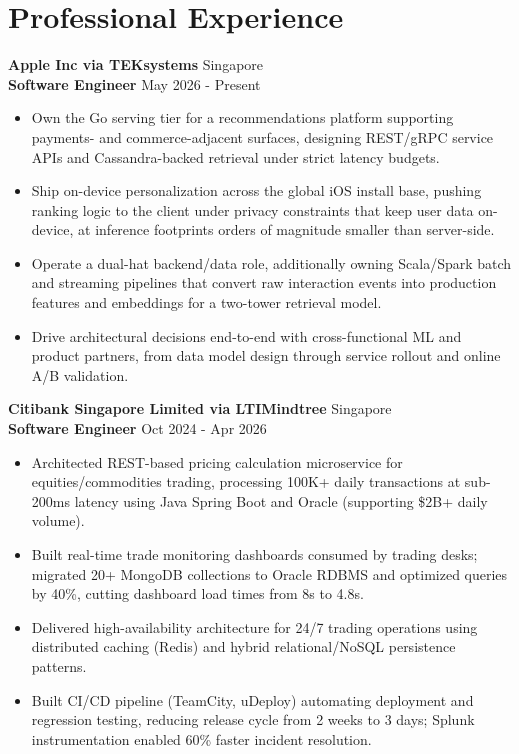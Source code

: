 \documentclass[10pt,a4paper]{article}
\newcommand{\resumeSubheading}[4]{
    {\sffamily\bfseries #1} \hfill {\small #2} \\
    \vspace{1pt}
    \textbf{#3} \hfill {\small #4}
}
\begin{document}
\section{Professional Experience}
\vspace{-2pt}

\resumeSubheading
{Apple Inc via TEKsystems}{Singapore}
{Software Engineer}{May 2026 - Present}
\vspace{-6pt}
\begin{itemize}[leftmargin=0.18in, label={\textbullet}, itemsep=1pt, parsep=0pt, topsep=3pt]
    \item Own the Go serving tier for a recommendations platform supporting payments- and commerce-adjacent surfaces, designing REST/gRPC service APIs and Cassandra-backed retrieval under strict latency budgets.
    \item Ship on-device personalization across the global iOS install base, pushing ranking logic to the client under privacy constraints that keep user data on-device, at inference footprints orders of magnitude smaller than server-side.
    \item Operate a dual-hat backend/data role, additionally owning Scala/Spark batch and streaming pipelines that convert raw interaction events into production features and embeddings for a two-tower retrieval model.
    \item Drive architectural decisions end-to-end with cross-functional ML and product partners, from data model design through service rollout and online A/B validation.
\end{itemize}
\vspace{2pt}

\resumeSubheading
{Citibank Singapore Limited via LTIMindtree}{Singapore}
{Software Engineer}{Oct 2024 - Apr 2026}
\vspace{-6pt}
\begin{itemize}[leftmargin=0.18in, label={\textbullet}, itemsep=1pt, parsep=0pt, topsep=3pt]
    \item Architected REST-based pricing calculation microservice for equities/commodities trading, processing 100K+ daily transactions at sub-200ms latency using Java Spring Boot and Oracle (supporting \$2B+ daily volume).
    \item Built real-time trade monitoring dashboards consumed by trading desks; migrated 20+ MongoDB collections to Oracle RDBMS and optimized queries by 40\%, cutting dashboard load times from 8s to 4.8s.
    \item Delivered high-availability architecture for 24/7 trading operations using distributed caching (Redis) and hybrid relational/NoSQL persistence patterns.
    \item Built CI/CD pipeline (TeamCity, uDeploy) automating deployment and regression testing, reducing release cycle from 2 weeks to 3 days; Splunk instrumentation enabled 60\% faster incident resolution.
\end{itemize}
\vspace{2pt}
\end{document}
